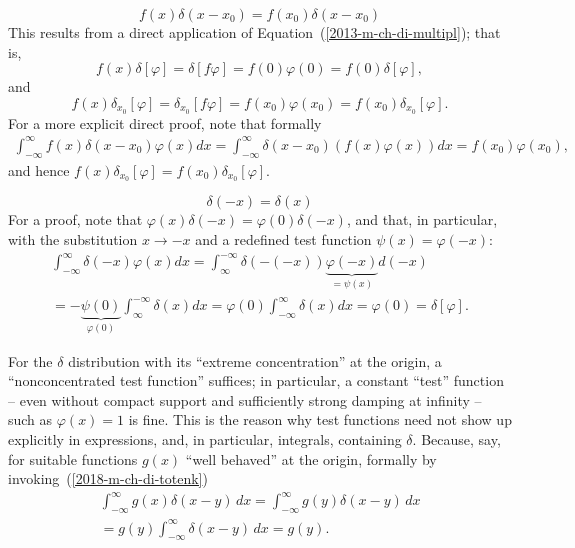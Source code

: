 \begin{equation}
 f (x)\delta (x-x_0)
 =
f (x_0)\delta (x-x_0)
\label{2018-m-ch-di-totenk}
 \end{equation}
{\color{OliveGreen}
\bproof
This results from a direct application of Equation~(\ref{2013-m-ch-di-multipl}); that is,
 \begin{equation}
f(x) \delta
[\varphi ]
=
\delta
\left[  f  \varphi \right]
=
f(0)\varphi(0) = f(0)   \delta
[\varphi ]
,
 \end{equation}
and
 \begin{equation}
f(x) \delta_{x_0}
[\varphi ]
=
\delta_{x_0}
\left[  f  \varphi \right]
=
f({x_0})\varphi({x_0}) = f({x_0})   \delta_{x_0}
[\varphi ]
.
 \end{equation}
For a more explicit direct proof, note that formally
 \begin{equation}
 \begin{split}
\int _{-\infty}^\infty f (x)\delta (x-x_0)  \varphi(x) dx
=
\int _{-\infty}^\infty\delta (x-x_0)  ( f (x)\varphi(x) ) dx = f(x_0) \varphi(x_0)
,
 \end{split}
 \end{equation}
and hence $f(x) \delta_{x_0}[ \varphi ] =   f(x_0)\delta_{x_0}[ \varphi ]$.
\eproof
}


 \begin{equation}
 \delta (-x)=\delta (x)
 \end{equation}
{\color{OliveGreen}
\bproof
For a proof, note that $\varphi (x)\delta (-x) = \varphi (0)\delta (-x)$, and that, in particular,
with the substitution $x \rightarrow -x$ and a redefined test function $\psi (x) =\varphi(-x)$:
 \begin{equation}
 \begin{split}
\int _{-\infty}^\infty \delta (-x)  \varphi(x) dx   =
 \int_\infty ^{-\infty}\delta (-(-x)) \underbrace{\varphi(-x)}_{=\psi(x)} d(-x) \\
   =
-\underbrace{\psi(0)}_{\varphi(0)} \int _\infty ^{-\infty}\delta (x)  d x     =
\varphi(0) \int _{-\infty}^\infty \delta (x)  d x =\varphi(0)=\delta[\varphi].
 \end{split}
 \end{equation}
\eproof
}


For the $\delta$ distribution with its ``extreme concentration'' at the origin, a ``nonconcentrated test function'' suffices; in particular, a constant ``test'' function
-- even without compact support and sufficiently strong damping at infinity --
such as $\varphi (x) = 1$ is fine.
This is the reason why test functions need not show up explicitly in expressions, and, in particular, integrals, containing $\delta$.
Because, say, for suitable functions $g(x)$ ``well behaved'' at the origin, formally by invoking~(\ref{2018-m-ch-di-totenk})
 \begin{equation}
 \begin{split}
\int_{-\infty}^{\infty} g(x)\delta(x-y) \,dx =
\int_{-\infty}^{\infty} g(y)\delta(x-y) \,dx \\=
g(y)\int_{-\infty}^{\infty} \delta(x-y)  \,dx =g(y).
 \end{split}
\end{equation}

